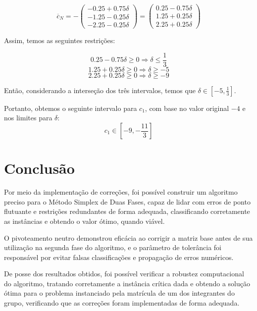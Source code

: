 \documentclass[12pt]{article}
\begin{document}
$$\overline{c}_N=-
\begin{pmatrix}
-0.25+0.75\delta\\-1.25-0.25\delta\\-2.25-0.25\delta
\end{pmatrix}
=
\begin{pmatrix}
0.25-0.75\delta\\1.25+0.25\delta\\2.25+0.25\delta
\end{pmatrix}
$$

Assim, temos as seguintes restrições:

$$0.25-0.75\delta\geq0\Rightarrow\delta\leq\frac{1}{3}$$
$$1.25+0.25\delta\geq0\Rightarrow\delta\geq-5$$
$$2.25+0.25\delta\geq0\Rightarrow\delta\geq-9$$

Então, considerando a interseção dos três intervalos, temos que $\delta\in\left[-5,\frac{1}{3}\right]$.

Portanto, obtemos o seguinte intervalo para $c_1$, com base no valor original $-4$ e nos limites para $\delta$:
$$c_1\in\left[-9,-\frac{11}{3}\right]$$

\section*{Conclusão}

Por meio da implementação de correções, foi possível construir um algoritmo preciso para o Método Simplex de Duas Fases, capaz de lidar com erros de ponto flutuante e restrições redundantes de forma adequada, classificando corretamente as instâncias e obtendo o valor ótimo, quando viável.

O pivoteamento neutro demonstrou eficácia ao corrigir a matriz base antes de sua utilização na segunda fase do algoritmo, e o parâmetro de tolerância foi responsável por evitar falsas classificações e propagação de erros numéricos.

De posse dos resultados obtidos, foi possível verificar a robustez computacional do algoritmo, tratando corretamente a instância crítica dada e obtendo a solução ótima para o problema instanciado pela matrícula de um dos integrantes do grupo, verificando que as correções foram implementadas de forma adequada.
\end{document}
